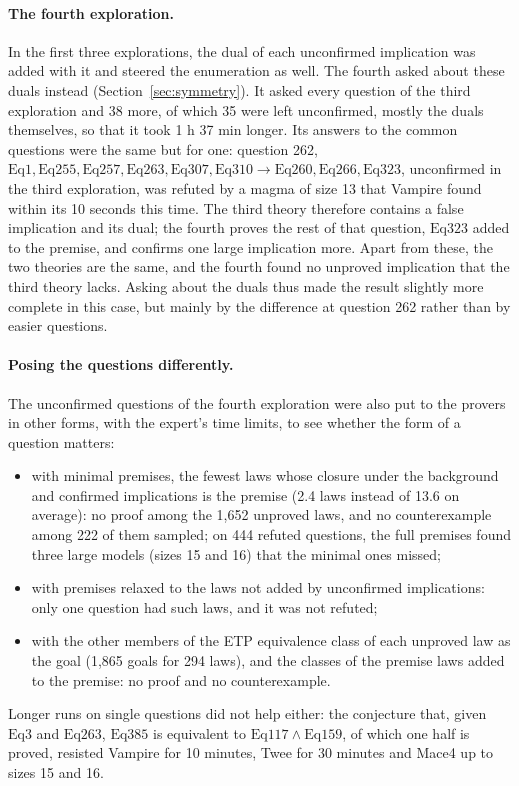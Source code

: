 \documentclass[11pt,a4paper]{article}
\theoremstyle{definition}
\theoremstyle{remark}
\newcommand{\Eq}[1]{\mathrm{Eq}#1}
\begin{document}
\paragraph{The fourth exploration.}
In the first three explorations, the dual of each unconfirmed implication was added with it and steered the enumeration as well. The fourth asked about these duals instead (Section~\ref{sec:symmetry}). It asked every question of the third exploration and 38 more, of which 35 were left unconfirmed, mostly the duals themselves, so that it took 1 h 37 min longer. Its answers to the common questions were the same but for one: question 262, $\Eq{1}, \Eq{255}, \Eq{257}, \Eq{263}, \Eq{307}, \Eq{310} \to \Eq{260}, \Eq{266}, \Eq{323}$, unconfirmed in the third exploration, was refuted by a magma of size 13 that Vampire found within its 10 seconds this time. The third theory therefore contains a false implication and its dual; the fourth proves the rest of that question, $\Eq{323}$ added to the premise, and confirms one large implication more. Apart from these, the two theories are the same, and the fourth found no unproved implication that the third theory lacks. Asking about the duals thus made the result slightly more complete in this case, but mainly by the difference at question 262 rather than by easier questions.

\paragraph{Posing the questions differently.}
The unconfirmed questions of the fourth exploration were also put to the provers in other forms, with the expert's time limits, to see whether the form of a question matters:
\begin{itemize}
  \item with minimal premises, the fewest laws whose closure under the background and confirmed implications is the premise (2.4 laws instead of 13.6 on average): no proof among the 1,652 unproved laws, and no counterexample among 222 of them sampled; on 444 refuted questions, the full premises found three large models (sizes 15 and 16) that the minimal ones missed;
  \item with premises relaxed to the laws not added by unconfirmed implications: only one question had such laws, and it was not refuted;
  \item with the other members of the ETP equivalence class of each unproved law as the goal (1,865 goals for 294 laws), and the classes of the premise laws added to the premise: no proof and no counterexample.
\end{itemize}
Longer runs on single questions did not help either: the conjecture that, given $\Eq{3}$ and $\Eq{263}$, $\Eq{385}$ is equivalent to $\Eq{117} \wedge \Eq{159}$, of which one half is proved, resisted Vampire for 10 minutes, Twee for 30 minutes and Mace4 up to sizes 15 and 16.
\end{document}
